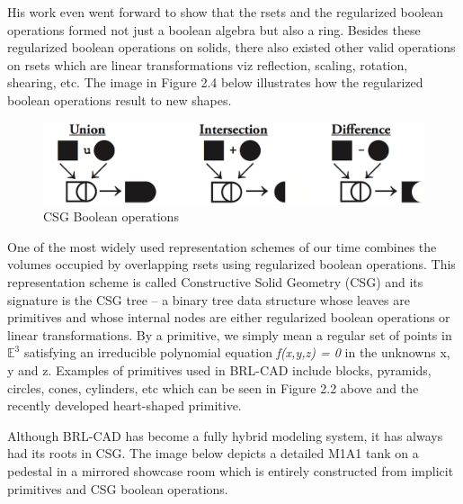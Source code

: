 \hspace{30} His   work   even   went   forward   to   show   that   the   r­sets   and   the   regularized  
boolean   operations   formed   not   just   a   boolean   algebra   but   also   a   ring.   Besides  
these   regularized   boolean   operations   on   solids,   there   also   existed   other   valid  
operations   on   r­sets   which   are   linear   transformations   viz   reflection,   scaling,  
rotation,   shearing,   etc.   The   image   in   Figure   2.4   below   illustrates   how   the  
regularized boolean operations result to new shapes.

\begin{figure}[htbp]
\centering
\includegraphics[trim=0.0cm 0.5cm 0.1cm 0.1cm, clip=true, totalheight=0.12\textheight]{Pictures/Boolean.png}
\caption[CSG Boolean operations]{CSG Boolean operations}
\label{Boolean}
\end{figure}

\hspace{30} One of the most widely used representation schemes of our time
combines the volumes occupied by overlapping r­sets using regularized
boolean operations. This representation scheme is called Constructive Solid
Geometry (CSG) and its signature is the CSG tree – a binary tree data
structure whose leaves are primitives and whose internal nodes are either
regularized boolean operations or linear transformations. By a primitive, we
simply mean a regular set of points in $\mathbb{E}^3$ satisfying an irreducible
polynomial equation \textit{f(x,y,z) = 0} in the unknowns x, y and z. Examples of
primitives used in BRL-­CAD include blocks, pyramids, circles, cones,
cylinders, etc which can be seen in Figure 2.2 above and the recently developed
heart­-shaped primitive. 

\hspace{30} Although   BRL-­CAD   has   become   a   fully   hybrid   modeling   system,   it   has  
always   had   its   roots   in   CSG.   The   image   below   depicts   a   detailed   M1A1   tank   on  
a   pedestal   in   a   mirrored   showcase   room   which   is   entirely   constructed   from  
implicit primitives and CSG boolean operations.  

